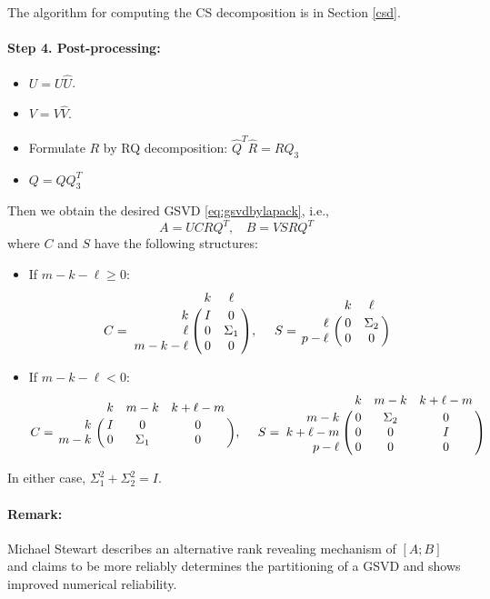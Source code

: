 The algorithm for computing the CS decomposition is in Section \ref{csd}. 
        
\paragraph{Step 4. Post-processing:} 
\begin{itemize}
\item $U = U \hat{U}$.
\item $V = V \hat{V}$.
\item Formulate $R$ by RQ decomposition: $\hat{Q}^{T}\hat{R} = RQ_{3}$ 
\item $Q = Q Q_{3}^{T}$
\end{itemize}
Then we obtain the desired GSVD \eqref{eq:gsvdbylapack}, i.e., 
\begin{equation} \label{eq-alg-4}
A = UCRQ^{T}, \ \ \ \ 
B = VSRQ^{T}
\end{equation}
where $C$ and $S$ have the following structures:
    \begin{itemize}
        \item If $m - k - \ell \geq 0$:
            \begin{displaymath}
                C = \bordermatrix{ & k & \ell  \cr
                \hfill k & I & 0 \cr
                \hfill \ell & 0 & \Sigma_1 \cr
                m-k-\ell & 0 & 0}, \  \ \ \
                S = \bordermatrix{ & k & \ell \cr
                \hfill \ell & 0 & \Sigma_2 \cr
                \hfill p-\ell & 0 & 0}
            \end{displaymath}
                
        \item If $m - k - \ell < 0$:
            \begin{displaymath}
                C = \bordermatrix{ & k & m-k & k+\ell-m  \cr
                \hfill k & I & 0 & 0\cr
                \hfill m-k & 0 & \Sigma_1 & 0}, \  \ \ \
                S = \bordermatrix{ & k & m-k & k+\ell-m \cr
                \hfill m-k & 0 & \Sigma_2 & 0\cr
                \hfill k+\ell-m & 0 & 0 & I\cr
                \hfill p-\ell & 0 & 0 & 0}
            \end{displaymath}
    \end{itemize}
    In either case, $\Sigma_1^2 + \Sigma_2^2 = I$.
    
\paragraph{Remark:}
Michael Stewart \cite{stewart2016rank} describes 
an alternative rank revealing mechanism of $[A; B]$ and claims to be 
more reliably determines the partitioning of a GSVD 
and shows improved numerical reliability.

